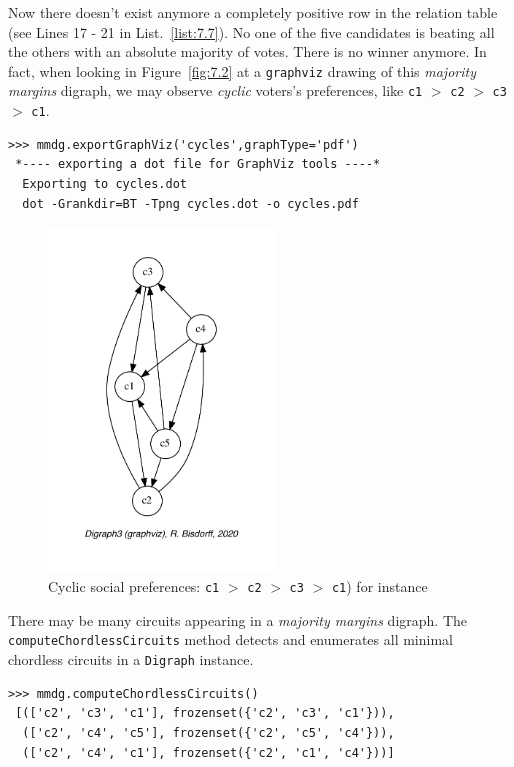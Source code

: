 Now there doesn't exist anymore a completely positive row in the relation table (see Lines 17 - 21 in List.~\ref{list:7.7}). No one of the five candidates is beating all the others with an absolute majority of votes. There is no \Condorcet winner anymore. In fact, when looking in Figure~\vref{fig:7.2} at a \texttt{graphviz} drawing of this \emph{majority margins} digraph, we may observe \emph{cyclic} voters's preferences, like \texttt{c1} $>$ \texttt{c2} $>$ \texttt{c3} $>$ \texttt{c1}.
\begin{lstlisting}
>>> mmdg.exportGraphViz('cycles',graphType='pdf')
 *---- exporting a dot file for GraphViz tools ----*
  Exporting to cycles.dot
  dot -Grankdir=BT -Tpng cycles.dot -o cycles.pdf
\end{lstlisting}
\begin{figure}[ht]
\sidecaption[t]
\includegraphics[width=6cm]{Figures/7-2-cycles.pdf}
\caption{Cyclic social preferences: \texttt{c1} $>$ \texttt{c2} $>$ \texttt{c3} $>$ \texttt{c1}) for instance}
\label{fig:7.2}       %
\end{figure}
	   
There may be many circuits appearing in a \emph{majority margins} digraph. The \texttt{computeChordlessCircuits} method detects and enumerates all minimal chordless circuits in a \texttt{Digraph} instance. 
\begin{lstlisting}
>>> mmdg.computeChordlessCircuits()
 [(['c2', 'c3', 'c1'], frozenset({'c2', 'c3', 'c1'})), 
  (['c2', 'c4', 'c5'], frozenset({'c2', 'c5', 'c4'})), 
  (['c2', 'c4', 'c1'], frozenset({'c2', 'c1', 'c4'}))]
\end{lstlisting}

